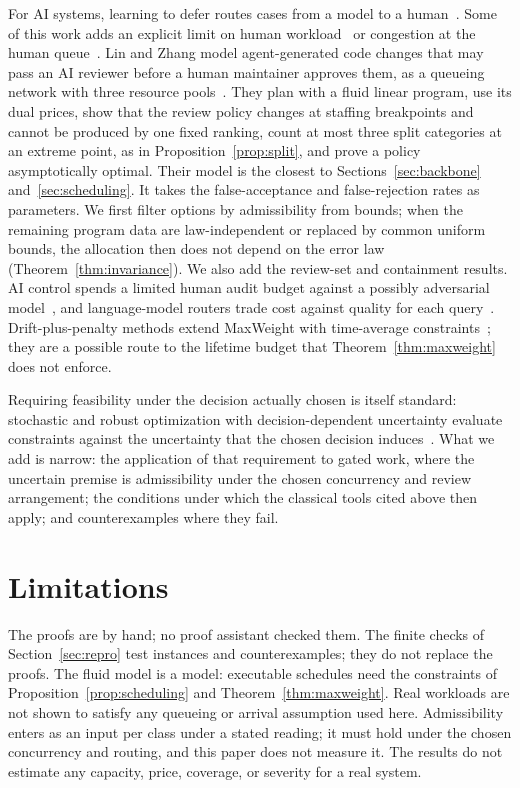 \documentclass[11pt]{article}
\theoremstyle{definition}
\theoremstyle{remark}
\begin{document}
For AI systems, learning to defer routes cases from a model to a human~\cite{madras18,mozannar20}.
Some of this work adds an explicit limit on human workload~\cite{okati21,alves24} or congestion at the
human queue~\cite{lykouris24}. Lin and Zhang model agent-generated code changes that may pass an AI
reviewer before a human maintainer approves them, as a queueing network with three resource
pools~\cite{linzhang26}. They plan with a fluid linear program, use its dual prices, show that the
review policy changes at staffing breakpoints and cannot be produced by one fixed ranking, count at
most three split categories at an extreme point, as in Proposition~\ref{prop:split}, and prove a policy
asymptotically optimal. Their model is the closest to Sections~\ref{sec:backbone}
and~\ref{sec:scheduling}. It takes the false-acceptance and false-rejection rates as parameters. We first filter
options by admissibility from bounds; when the remaining program data are law-independent or replaced
by common uniform bounds, the allocation then does not depend on the error law
(Theorem~\ref{thm:invariance}). We also add the review-set and containment results. AI control spends a
limited human audit budget against a possibly adversarial model~\cite{greenblatt23,griffin24}, and
language-model routers trade cost against quality for each query~\cite{chen23,ong24}. Drift-plus-penalty
methods extend MaxWeight with time-average constraints~\cite{neely10}; they are a possible route to
the lifetime budget that Theorem~\ref{thm:maxweight} does not enforce.

Requiring feasibility under the decision actually chosen is itself standard: stochastic and robust
optimization with decision-dependent uncertainty evaluate constraints against the uncertainty that the
chosen decision induces~\cite{goel06,nohadani18}. What we add is narrow: the application of that
requirement to gated work, where the uncertain premise is admissibility under the chosen concurrency
and review arrangement; the conditions under which the classical tools cited above then apply; and
counterexamples where they fail.

\section{Limitations}\label{sec:limits}
The proofs are by hand; no proof assistant checked them. The finite checks of
Section~\ref{sec:repro} test instances and counterexamples; they do not replace the proofs. The fluid
model is a model: executable schedules need the constraints of Proposition~\ref{prop:scheduling}
and Theorem~\ref{thm:maxweight}. Real workloads are not shown to satisfy any queueing or arrival
assumption used here. Admissibility enters as an input per class under a stated reading; it must hold
under the chosen concurrency and routing, and this paper does not measure it. The results do not
estimate any capacity, price, coverage, or severity for a real system.
\end{document}
